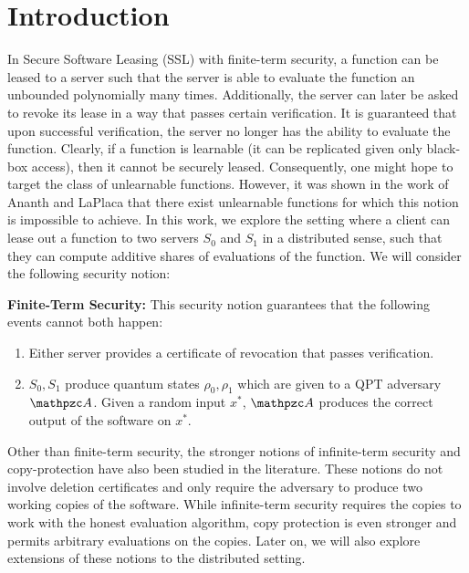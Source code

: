 \section{Introduction}\label{sec:motive}

In Secure Software Leasing (SSL) with finite-term security, a
function can be leased to a server such that the server is able to
evaluate the function an unbounded polynomially many times.
Additionally, the server can later be asked to revoke its lease in a
way that passes certain verification. It is guaranteed that upon
successful verification, the server no longer has the ability to
evaluate the function.  Clearly, if a function is learnable (it can
be replicated given only black-box access), then it cannot be
securely leased.  Consequently, one might hope to target the class
of unlearnable functions.  However, it was shown in the work of
Ananth and LaPlaca \cite{EC:AnaLaP21} that there exist unlearnable
functions for which this notion is impossible to achieve. In this
work, we explore the setting where a client can lease out a function
to two servers $S_0$ and $S_1$ in a distributed sense, such that
they can compute additive shares of evaluations of the function. We
will consider the following security notion:

\begin{description}
\item \textbf{Finite-Term Security:} This
security notion guarantees that the following events cannot both
happen:

\begin{enumerate}
\item Either server provides a certificate of revocation that
passes verification.
\item $S_0, S_1$ produce quantum states $\rho_0, \rho_1$ which are
given to a QPT adversary $\qA$. Given a random input $x^*$, $\qA$
produces the correct output of the software on $x^*$.
\end{enumerate}
\end{description}

Other than finite-term security, the stronger notions of
infinite-term security and copy-protection have also been studied in
the literature. These notions do not involve deletion certificates
and only require the adversary to produce two working copies of the
software. While infinite-term security requires the copies to work
with the honest evaluation algorithm, copy protection is even
stronger and permits arbitrary evaluations on the copies.  Later on,
we will also explore extensions of these notions to the distributed
setting.

